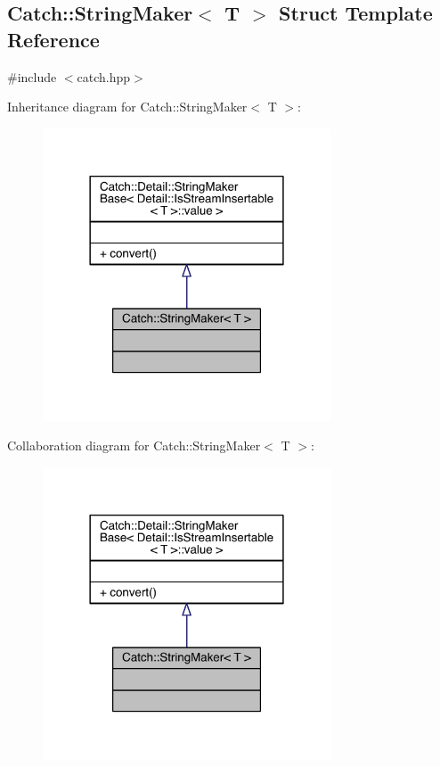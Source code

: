 \hypertarget{a00078}{}\subsection{Catch\+:\+:String\+Maker$<$ T $>$ Struct Template Reference}
\label{a00078}


{\ttfamily \#include $<$catch.\+hpp$>$}



Inheritance diagram for Catch\+:\+:String\+Maker$<$ T $>$\+:\nopagebreak
\begin{figure}[H]
\begin{center}
\leavevmode
\includegraphics[width=242pt]{a00272}
\end{center}
\end{figure}


Collaboration diagram for Catch\+:\+:String\+Maker$<$ T $>$\+:\nopagebreak
\begin{figure}[H]
\begin{center}
\leavevmode
\includegraphics[width=242pt]{a00273}
\end{center}
\end{figure}
